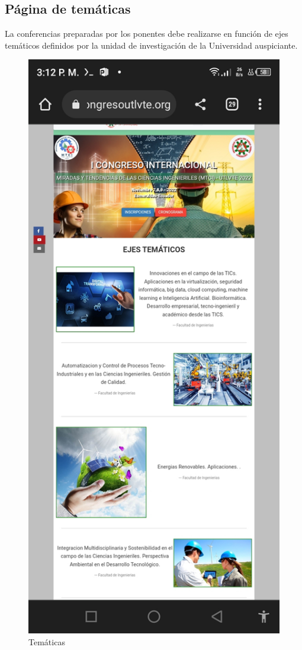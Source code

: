 \documentclass[a4paper,14px]{article}
\begin{document}
\newpage
\subsection{Página de temáticas }
\label{sec:pagina-principal}

La conferencias preparadas por los ponentes debe realizarse en función de ejes temáticos definidos por la unidad de investigación de la Universidad auspiciante.

\begin{minipage}[H]{0.5\linewidth}
  \begin{figure}[H]
    \centering
    \includegraphics[scale=0.3]{tematicas.jpg}
    \caption{Temáticas}
    \label{fig:tematicas1}
  \end{figure}
\end{minipage}
\end{document}
